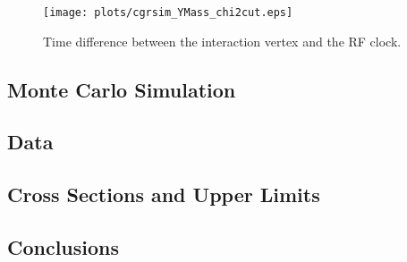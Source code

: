 \begin{figure}[H]
    \centering
        \texttt{[image: plots/cgrsim\_YMass\_chi2cut.eps]}
        \caption{Time difference between the interaction vertex and the RF clock.}
        \label{fig.4.1.a}
\end{figure}

\subsection{Monte Carlo Simulation}



\subsection{Data}

\subsection{Cross Sections and Upper Limits}

\subsection{Conclusions}
